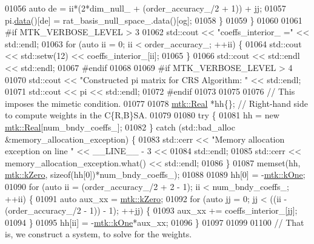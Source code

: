 \begin{DoxyCode}
{{01056       \textcolor{keyword}{auto} de = ii*(2*dim\_null\_ + (order\_accuracy\_/2 + 1)) + jj;
01057       pi.\hyperlink{classmtk_1_1DenseMatrix_a0c33b8a9e01d157c61ddbdf807c25d84}{data}()[de] = rat\_basis\_null\_space\_.data()[og];
01058     \}
01059   \}
01060 
01061 \textcolor{preprocessor}{  #if MTK\_VERBOSE\_LEVEL > 3}
01062   std::cout << \textcolor{stringliteral}{"coeffs\_interior\_ ="} << std::endl;
01063   \textcolor{keywordflow}{for} (\textcolor{keyword}{auto} ii = 0; ii < order\_accuracy\_; ++ii) \{
01064     std::cout << std::setw(12) << coeffs\_interior\_[ii];
01065   \}
01066   std::cout << std::endl << std::endl;
01067 \textcolor{preprocessor}{  #endif}
01068 
01069 \textcolor{preprocessor}{  #if MTK\_VERBOSE\_LEVEL > 4}
01070   std::cout << \textcolor{stringliteral}{"Constructed pi matrix for CRS Algorithm: "} << std::endl;
01071   std::cout << pi << std::endl;
01072 \textcolor{preprocessor}{  #endif}
01073 
01075 
01076   \textcolor{comment}{// This imposes the mimetic condition.}
01077 
01078   \hyperlink{group__c01-roots_gac080bbbf5cbb5502c9f00405f894857d}{mtk::Real} *hh\{\};  \textcolor{comment}{// Right-hand side to compute weights in the C\{R,B\}SA.}
01079 
01080   \textcolor{keywordflow}{try} \{
01081     hh = \textcolor{keyword}{new} \hyperlink{group__c01-roots_gac080bbbf5cbb5502c9f00405f894857d}{mtk::Real}[num\_bndy\_coeffs\_];
01082   \} \textcolor{keywordflow}{catch} (std::bad\_alloc &memory\_allocation\_exception) \{
01083     std::cerr << \textcolor{stringliteral}{"Memory allocation exception on line "} << \_\_LINE\_\_ - 3 <<
01084       std::endl;
01085     std::cerr << memory\_allocation\_exception.what() << std::endl;
01086   \}
01087   memset(hh, \hyperlink{group__c01-roots_ga59a451a5fae30d59649bcda274fea271}{mtk::kZero}, \textcolor{keyword}{sizeof}(hh[0])*num\_bndy\_coeffs\_);
01088 
01089   hh[0] = -\hyperlink{group__c01-roots_ga26407c24d43b6b95480943340d285c71}{mtk::kOne};
01090   \textcolor{keywordflow}{for} (\textcolor{keyword}{auto} ii = (order\_accuracy\_/2 + 2 - 1); ii < num\_bndy\_coeffs\_; ++ii) \{
01091     \textcolor{keyword}{auto} aux\_xx = \hyperlink{group__c01-roots_ga59a451a5fae30d59649bcda274fea271}{mtk::kZero};
01092     \textcolor{keywordflow}{for} (\textcolor{keyword}{auto} jj = 0; jj < ((ii - (order\_accuracy\_/2 - 1)) - 1); ++jj) \{
01093       aux\_xx += coeffs\_interior\_[jj];
01094     \}
01095     hh[ii] = -\hyperlink{group__c01-roots_ga26407c24d43b6b95480943340d285c71}{mtk::kOne}*aux\_xx;
01096   \}
01097 
01099 
01100   \textcolor{comment}{// That is, we construct a system, to solve for the weights.}
}}
\end{DoxyCode}
